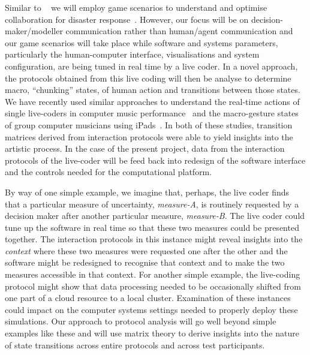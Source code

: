\documentclass[a4paper,fontsize=12pt]{scrartcl}
\begin{document}



Similar to ~\parencite{ramchurn2016human} we will employ game
scenarios to understand and optimise collaboration for disaster
response~\parencite{ramchurn2016human}. However, our focus will be on
decision-maker/modeller communication rather than human/agent
communication and our game scenarios will take place while software
and systems parameters, particularly the human-computer interface,
visualisations and system configuration, are being tuned in real time
by a live coder. In a novel approach, the protocols obtained from this
live coding will then be analyse to determine macro, ``chunking''
states, of human action and transitions between those states. We have
recently used similar approaches to understand the real-time actions
of single live-coders in computer music
performance~\parencite{swift2014coding} and the macro-gesture states
of group computer musicians using
iPads~\parencite{martin2015tracking}. In both of these studies,
transition matrices derived from interaction protocols were able to
yield insights into the artistic process. In the case of the present
project, data from the interaction protocols of the live-coder will be
feed back into redesign of the software interface and the controls
needed for the computational platform.

By way of one simple example, we imagine that, perhaps, the live coder
finds that a particular measure of uncertainty, \emph{measure-A}, is
routinely requested by a decision maker after another particular
measure, \emph{measure-B}. The live coder could tune up the software
in real time so that these two measures could be presented together.
The interaction protocols in this instance might reveal insights into
the \emph{context} where these two measures were requested one after
the other and the software might be redesigned to recognise that
context and to make the two measures accessible in that context. For
another simple example, the live-coding protocol might show that data
processing needed to be occasionally shifted from one part of a cloud
resource to a local cluster. Examination of these instances could
impact on the computer systems settings needed to properly deploy
these simulations. Our approach to protocol analysis will go well
beyond simple examples like these and will use matrix theory to derive
insights into the nature of state transitions across entire protocols
and across test participants.
\end{document}
